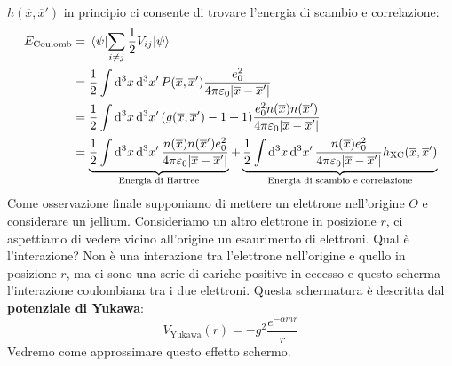 $h(\overline x, \overline{x}')$ in principio ci consente di trovare l'energia di scambio e correlazione:
\begin{equation*}
    \begin{aligned}
        E_{\text{Coulomb}} & =\mel{\psi}{\sum_{i\neq j}\frac 12 V_{ij}}{\psi} \\
        & = \frac 12 \int \dd[3]{x}\dd[3]{x'}P(\overline x, \overline{x}')\frac{e_0^2}{4\pi\varepsilon_0|\overline{x}-\overline{x}'|} \\
        & = \frac 12 \int \dd[3]{x}\dd[3]{x'}(g(\overline x, \overline{x}')-1+1)\frac{e_0^2n(\overline x)n(\overline{x}')}{4\pi\varepsilon_0|\overline{x}-\overline{x}'|} \\
        & = \underbrace{\frac 12 \int \dd[3]{x}\dd[3]{x'}\frac{n(\overline x)n(\overline{x}')e_0^2}{4\pi\varepsilon_0|\overline{x}-\overline{x}'|}}_{\text{Energia di Hartree}}+\underbrace{\frac 12 \int \dd[3]{x}\dd[3]{x'}\frac{n(\overline x)e_0^2}{4\pi\varepsilon_0|\overline{x}-\overline{x}'|}h_{\text{XC}}(\overline{x}, \overline{x}')}_{\text{Energia di scambio e correlazione}}
    \end{aligned}
\end{equation*}
Come osservazione finale supponiamo di mettere un elettrone nell'origine $O$ e considerare un jellium. Consideriamo un altro elettrone in posizione $r$, ci aspettiamo di vedere vicino all'origine un esaurimento di elettroni. Qual è l'interazione? Non è una interazione tra l'elettrone nell'origine e quello in posizione $r$, ma ci sono una serie di cariche positive in eccesso e questo scherma l'interazione coulombiana tra i due elettroni. Questa schermatura è descritta dal \textbf{potenziale di Yukawa}:
\begin{equation*}
    V_{\text{Yukawa}}(r)=-g^2\frac{e^{-\alpha mr}}{r}
\end{equation*}
Vedremo come approssimare questo effetto schermo.